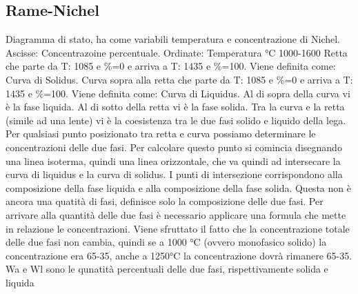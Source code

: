 \documentclass{article}%
\begin{document}
\subsection{ Rame{-}Nichel }%
\label{subsec:Rame{-}Nichel}%
Diagramma di stato, ha come variabili temperatura e concentrazione di Nichel.\newline%
%
Ascisse: Concentrazoine percentuale.\newline%
%
Ordinate: Temperatura °C 1000{-}1600\newline%
%
Retta che parte da T: 1085 e \%=0 e arriva a T: 1435 e \%=100. Viene definita come: Curva di Solidus.\newline%
%
Curva sopra alla retta che parte da T: 1085 e \%=0 e arriva a T: 1435 e \%=100. Viene definita come: Curva di Liquidus.\newline%
%
\newline%
%
Al di sopra della curva vi è la fase liquida.\newline%
%
Al di sotto della retta vi è la fase solida.\newline%
%
\newline%
%
Tra la curva e la retta (simile ad una lente) vi è la coesistenza tra le due fasi solido e liquido della lega.\newline%
%
\newline%
%
Per qualsiasi punto posizionato tra retta e curva possiamo determinare le concentrazioni delle due fasi.\newline%
%
Per calcolare questo punto si comincia disegnando una linea isoterma, quindi una linea orizzontale, che va quindi ad intersecare\newline%
%
la curva di liquidus e la curva di solidus. I punti di intersezione corrispondono alla composizione della fase liquida e alla\newline%
%
composizione della fase solida. Questa non è ancora una quatità di fasi, definisce solo la composizione delle due fasi.\newline%
%
Per arrivare alla quantità delle due fasi è necessario applicare una formula che mette in relazione le concentrazioni.\newline%
%
Viene sfruttato il fatto che la concentrazione totale delle due fasi non cambia, quindi se a 1000 °C (ovvero monofasico solido) la\newline%
%
concentrazione era 65{-}35, anche a 1250°C la concentrazione dovrà rimanere 65{-}35.\newline%
%
\newline%
%
Wa e Wl sono le qunatità percentuali delle due fasi, rispettivamente solida e liquida\newline%
\end{document}
